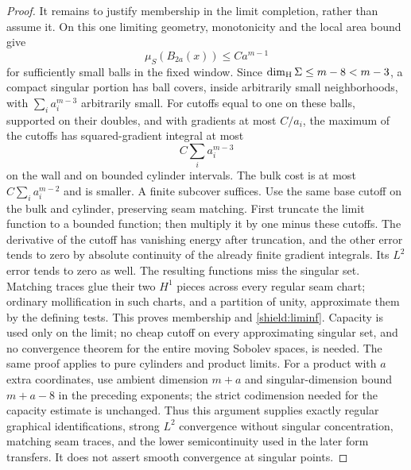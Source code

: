 \documentclass[11pt]{article}
\numberwithin{equation}{section}
\theoremstyle{definition}
\theoremstyle{remark}
\begin{document}
\begin{proof}
It remains to justify membership in the limit completion, rather than
assume it.  On this one limiting geometry, monotonicity and the local
area bound give
\[
 \mu_S(B_{2a}(x))\le C a^{m-1}
\]
for sufficiently small balls in the fixed window.  Since
$\dim_{\rm H}\Sigma\le m-8<m-3$, a compact singular portion has ball
covers, inside arbitrarily small neighborhoods, with
$\sum_i a_i^{m-3}$ arbitrarily small.  For cutoffs equal to one on these
balls, supported on their doubles, and with gradients at most $C/a_i$,
the maximum of the cutoffs has squared-gradient integral at most
\[
 C\sum_i a_i^{m-3}
\]
on the wall and on bounded cylinder intervals.  The bulk cost is at
most $C\sum_i a_i^{m-2}$ and is smaller.  A finite subcover suffices.
Use the same base cutoff on the bulk and cylinder, preserving seam
matching.  First truncate the limit function to a bounded function;
then multiply it by one minus these cutoffs.  The derivative of the
cutoff has vanishing energy after truncation, and the other error tends
to zero by absolute continuity of the already finite gradient
integrals.  Its $L^2$ error tends to zero as well.  The resulting functions
miss the singular set.  Matching traces glue their two $H^1$ pieces
across every regular seam chart; ordinary mollification in such charts,
and a partition of unity, approximate them by the defining tests.
This proves membership and \cref{shield:liminf}.  Capacity is used only
on the limit; no cheap cutoff on every approximating singular set, and
no convergence theorem for the entire moving Sobolev spaces, is needed.
The same proof applies to pure cylinders and product limits.
For a product with $a$ extra coordinates, use ambient dimension $m+a$
and singular-dimension bound $m+a-8$ in the preceding exponents;
the strict codimension needed for the capacity estimate is unchanged.
Thus this argument supplies exactly regular graphical identifications,
strong $L^2$ convergence without singular concentration, matching seam
traces, and the lower semicontinuity used in the later form transfers.
It does not assert smooth convergence at singular points.
\end{proof}
\end{document}

